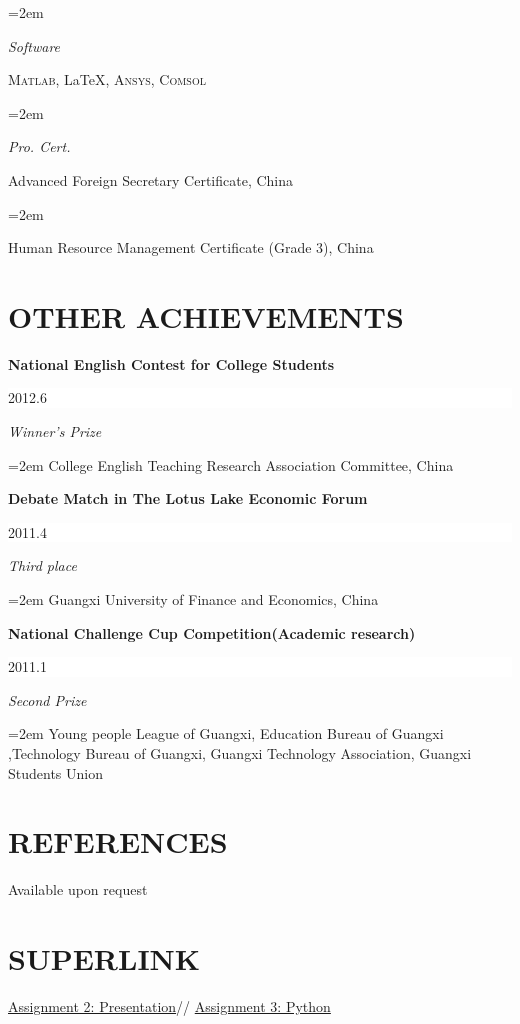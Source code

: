 \documentclass[paper=a4,fontsize=11.5pt]{scrartcl}
\newlength{\spacebox}
\newcommand{\sepspace}{\vspace*{1em}}
\newcommand{\NewPart}[1]{\section*{\uppercase{#1}}}
\newcommand{\SkillsEntry}[2]{
	\noindent\hangindent=2em\hangafter=0
	\parbox{\spacebox}{\textit{#1}}\hspace{1.5em} #2 \par}
\newcommand{\EducationEntry}[4]{
	\noindent \textbf{#1} 
	\hfill\colorbox{White}{
		\parbox{6em}{\hfill\color{Black}#2}}
	\par\noindent\textit{#3}
	\par\noindent\hangindent=2em\hangafter=0 
	\small #4\normalsize \par}
\begin{document}
\SkillsEntry{Software}{\textsc{Matlab}, \LaTeX, \textsc{Ansys}, \textsc{Comsol}}\sepspace

\SkillsEntry{Pro. Cert.}{Advanced Foreign Secretary Certificate, China}

\SkillsEntry{}{Human Resource Management Certificate (Grade 3), China}

\NewPart{Other Achievements}{}

\EducationEntry{National English Contest for College Students}{2012.6}{Winner's Prize}{College English Teaching Research Association Committee, China}
\sepspace
\EducationEntry{Debate Match in The Lotus Lake Economic Forum}{2011.4}{Third place}{Guangxi University of Finance and Economics, China}
\sepspace
\EducationEntry{National Challenge Cup Competition(Academic research)}{2011.1}{Second Prize}{Young people League of Guangxi, Education Bureau of Guangxi ,Technology Bureau of Guangxi, Guangxi Technology Association, Guangxi Students Union}
\sepspace
\NewPart{References}
Available upon request
\NewPart{Superlink}
\href{http://littleskyline.github.io/second-repo/NoCss.html}{Assignment 2: Presentation}//
\href{https://github.com/littleskyline/third-repo/blob/gh-pages/Numerical-Assignment.ipynb}{Assignment 3: Python}
\end{document}
